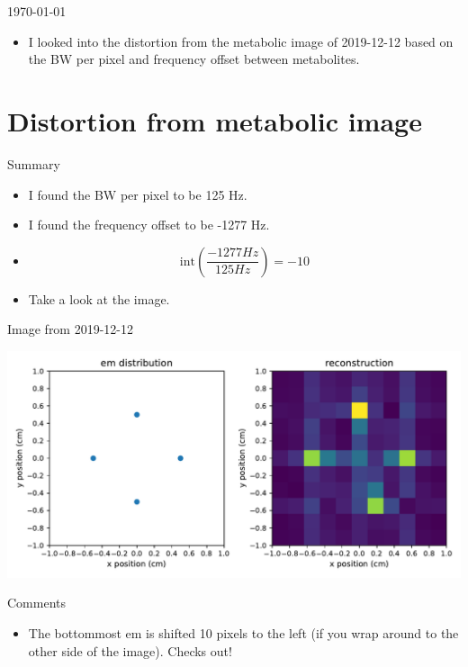 \documentclass[dvipsnames]{beamer}
\begin{document}
\begin{frame}{\today}
\begin{itemize}
\item I looked into the distortion from the metabolic image of 2019-12-12 based on the BW per pixel and frequency offset between metabolites.
\end{itemize}
\end{frame}

\section{Distortion from metabolic image}

\begin{frame}{Summary}
\begin{itemize}
\item I found the BW per pixel to be 125 Hz.
\item I found the frequency offset to be -1277 Hz.
\item \begin{equation*} \mathrm{int}\left(\frac{-1277 Hz}{125 Hz} \right) = -10\end{equation*}
\item Take a look at the image.
\end{itemize}
\end{frame}

\begin{frame}{Image from 2019-12-12}
\begin{center}
\includegraphics[width=\textwidth]{reconstruction_metabolism-on-20percent}
\end{center}
\end{frame}

\begin{frame}{Comments}
\begin{itemize}
\item The bottommost em is shifted 10 pixels to the left (if you wrap around to the other side of the image). Checks out!
\end{itemize}
\end{frame}
\end{document}
